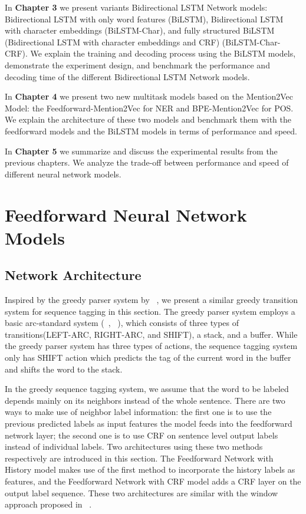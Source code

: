 \documentclass{sfuthesis}
\begin{document}
In \textbf{Chapter 3} we present variants Bidirectional LSTM Network models: Bidirectional LSTM with only word features (BiLSTM), Bidirectional LSTM with character embeddings (BiLSTM-Char), and fully structured BiLSTM (Bidirectional LSTM with character embeddings and CRF) (BiLSTM-Char-CRF). We explain the training and decoding process using the BiLSTM models, demonstrate the experiment design, and benchmark the performance and decoding time of the different Bidirectional LSTM Network models.

In \textbf{Chapter 4} we present two new multitask models based on the Mention2Vec Model: the Feedforward-Mention2Vec for NER and BPE-Mention2Vec for POS. We explain the architecture of these two models and benchmark them with the feedforward models and the BiLSTM models in terms of performance and speed.

In \textbf{Chapter 5} we summarize and discuss the experimental results from the previous chapters. We analyze the trade-off between performance and speed of different neural network models.


\chapter{Feedforward Neural Network Models}

\section{Network Architecture}

Inspired by the greedy parser system by ~\cite{chen2014fast}, we present a similar greedy transition system for sequence tagging in this section. The greedy parser system employs a basic arc-standard system (~\citeauthor{nivre2004deterministic}, ~\citeyear{nivre2004deterministic}), which consists of three types of transitions(LEFT-ARC, RIGHT-ARC, and SHIFT), a stack, and a buffer. While the greedy parser system has three types of actions, the sequence tagging system only has SHIFT action which predicts the tag of the current word in the buffer and shifts the word to the stack. 

In the greedy sequence tagging system, we assume that the word to be labeled depends mainly on its neighbors instead of the whole sentence. There are two ways to make use of neighbor label information: the first one is to use the previous predicted labels as input features the model feeds into the feedforward network layer; the second one is to use CRF on sentence level output labels instead of individual labels. Two architectures using these two methods respectively are introduced in this section. The Feedforward Network with History model makes use of the first method to incorporate the history labels as features, and the Feedforward Network with CRF model adds a CRF layer on the output label sequence. These two architectures are similar with the window approach proposed in ~\cite{collobert2011natural}.
\end{document}
